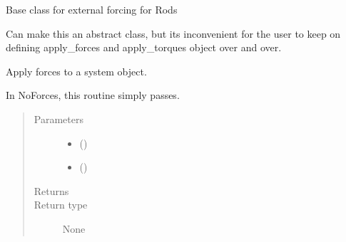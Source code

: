 \documentclass[letterpaper,10pt,english]{sphinxmanual}
\begin{document}

\begin{fulllineitems}
\label{\detokenize{documentation:elastica.external_forces.NoForces}}
Base class for external forcing for Rods

Can make this an abstract class, but its inconvenient
for the user to keep on defining apply\_forces and
apply\_torques object over and over.

\begin{fulllineitems}
\label{\detokenize{documentation:elastica.external_forces.NoForces.apply_forces}}
Apply forces to a system object.

In NoForces, this routine simply passes.
\begin{quote}\begin{description}
\item[{Parameters}] \leavevmode\begin{itemize}
\item {} 
 () \textendash{} 

\item {} 
 (\sphinxstyleliteralemphasis{\sphinxupquote{, }}) \textendash{} 

\end{itemize}

\item[{Returns}] \leavevmode


\item[{Return type}] \leavevmode
None

\end{description}\end{quote}

\end{fulllineitems}


\end{fulllineitems}
\end{document}
